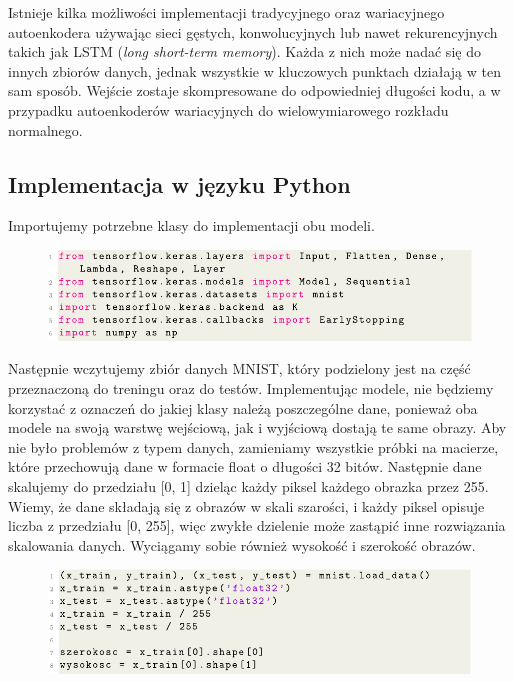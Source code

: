\documentclass[a4paper,12pt]{book} %
\begin{document}
Istnieje kilka możliwości implementacji tradycyjnego oraz wariacyjnego autoenkodera używając sieci gęstych, konwolucyjnych lub nawet rekurencyjnych takich jak LSTM (\textit{long short-term memory}). Każda z nich może nadać się do innych zbiorów danych, jednak wszystkie w kluczowych punktach działają w ten sam sposób. Wejście zostaje skompresowane do odpowiedniej długości kodu, a w przypadku autoenkoderów wariacyjnych do wielowymiarowego rozkładu normalnego. 
\subsection{Implementacja w języku Python}
Importujemy potrzebne klasy do implementacji obu modeli.
\begin{figure}[h!]
	\centering
	\includegraphics[width=\linewidth]{importy.pdf}
\end{figure}

Następnie wczytujemy zbiór danych MNIST, który podzielony jest na część przeznaczoną do treningu oraz do testów. Implementując modele, nie będziemy korzystać z oznaczeń do jakiej klasy należą poszczególne dane, ponieważ oba modele na swoją warstwę wejściową, jak i wyjściową dostają te same obrazy. Aby nie było problemów z typem danych, zamieniamy wszystkie próbki na macierze, które przechowują dane w formacie float o długości 32 bitów. Następnie dane skalujemy do przedziału [0, 1] dzieląc każdy piksel każdego obrazka przez 255. Wiemy, że dane składają się z obrazów w skali szarości, i każdy piksel opisuje liczba z przedziału [0, 255], więc zwykłe dzielenie może zastąpić inne rozwiązania skalowania danych. Wyciągamy sobie również wysokość i szerokość obrazów.
\begin{figure}[h!]
	\centering
	\includegraphics[width=\linewidth]{dane.pdf}
\end{figure}
\end{document}

